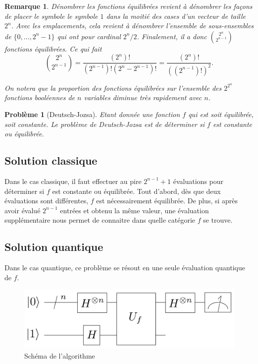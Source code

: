 \documentclass[12pt,a4paper]{article}
\newtheorem{pb}{Problème}
\newtheorem{rem}{Remarque}
\begin{document}
\begin{rem}
  Dénombrer les fonctions équilibrées revient à dénombrer les façons
  de placer le symbole le symbole $1$ dans la moitié des cases d'un
  vecteur de taille $2^n$. Avec les emplacements, cela revient à
  dénombrer l'ensemble de sous-ensembles de $\{0, \dots, 2^{n}-1 \}$
  qui ont pour cardinal $2^n / 2$. Finalement, il a donc
  ${\displaystyle {2^n \choose 2^{n-1}}}$ fonctions équilibrées. Ce qui fait
  \[ {\displaystyle {2^n \choose 2^{n-1}}} = \frac{(2^n)!}{(2^{n-1})!(2^n-2^{n-1})!} = \frac{(2^n)!}{((2^{n-1})!)^2}.  \]

  On notera que la proportion des fonctions équilibrées sur l'ensemble
  des $2^{2^n}$ fonctions booléennes de $n$ variables diminue très
  rapidement avec $n$.
  
\end{rem}


\begin{pb}[Deutsch-Jozsa]
Etant donnée une fonction $f$ qui est soit équilibrée, soit constante.
Le problème de Deutsch-Jozsa est de déterminer si $f$ est constante ou
équilibrée.  
\end{pb}

\subsection{Solution classique}
Dans le cas classique, il faut effectuer au pire $2^{n-1}+1$
évaluations pour déterminer si $f$ est constante ou équilibrée. Tout
d'abord, dès que deux évaluations sont différentes, $f$ est
nécessairement équilibrée. De plus, si après avoir évalué $2^{n-1}$
entrées et obtenu la même valeur, une évaluation supplémentaire nous
permet de connaitre dans quelle catégorie $f$ se trouve.

\subsection{Solution quantique}
Dans le cas quantique, ce problème se résout en une seule évaluation
quantique de $f$.

\begin{figure}[htbp]
    \centering
    \includegraphics[scale=0.2]{Deutsch-Jozsa_Algorithm.png}
    \caption{Schéma de l'algorithme}
    \label{fig:univerise}
\end{figure}
\end{document}
